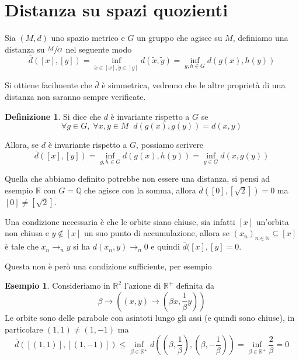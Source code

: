 \documentclass[a4paper,10pt]{article}
\newcounter{counter1}
\theoremstyle{plain}
\theoremstyle{definition}
\newtheorem{mydef}[counter1]{Definizione}
\newtheorem{myes}[counter1]{Esempio}
\theoremstyle{remark}
\newtheorem{mynot}[counter1]{Nota}
\newcommand{\pa}[1]{\left(#1\right)}
\newcommand{\bra}[1]{\left[#1\right]}
\begin{document}




\section{Distanza su spazi quozienti}

Sia $(M,d)$ uno spazio metrico e $G$ un gruppo che agisce su $M$,
definiamo una distanza su $\sfrac{M}{G}$ nel seguente modo
\[ \bar d (\bra{x}, \bra{y}) = \inf _{\tilde x \in \bra{x} , \tilde y
  \in \bra {y}} d(\tilde x , \tilde y) = \inf _ {g,h \in G} d(g(x),
h(y)) \]

Si ottiene facilmente che $\bar d$ è simmetrica, vedremo che le altre
proprietà di una distanza non saranno sempre verificate.

\begin{mydef}
  Si dice che $d$ è invariante rispetto a $G$ se
\[ \forall g \in G,\; \forall x,y \in M \;\; d(g(x),g(y)) = d(x,y) \]
\end{mydef}

Allora, se $d$ è invariante rispetto a $G$, possiamo scrivere
\[ \bar d (\bra{x}, \bra{y}) = \inf _ {g,h \in G} d(g(x), h(y)) =
\inf _{g \in G} d(x,g(y)) \]

Quella che abbiamo definito potrebbe non essere una distanza, si pensi
ad esempio $\mathbb{R}$ con $G = \mathbb{Q}$ che agisce con la somma,
allora $\bar d \pa{ \bra{0} , \bra{\sqrt{2}} } = 0$ ma $\bra{0} \neq
\bra{\sqrt{2}}$.

Una condizione necessaria è che le orbite siano chiuse, sia infatti
$\bra{x}$ un'orbita non chiusa e $y \not\in \bra{x}$ un suo punto di
accumulazione, allora se $\pa{ x_n} _{n \in \mathbb{N}} \subseteq
\bra{x}$ è tale che $x_n \to _n y$ si ha $d(x_n,y) \to _n 0$ e quindi
$\bar d(\bra{x},\bra{y} = 0$.

Questa non è però una condizione sufficiente, per esempio
\begin{myes}
  Consideriamo in $\mathbb{R}^2$ l'azione di $\mathbb{R}^+$ definita
  da
  \[ \beta \to \pa{ \pa{x,y} \to \pa{\beta x , \frac{1}{\beta}y } } \]
  Le orbite sono delle parabole con asintoti lungo gli assi (e quindi
  sono chiuse), in particolare $\pa{1,1} \neq \pa{1,-1}$ ma
  \[ \bar d( \bra{ \pa{ 1,1} } , \bra{ \pa {1, -1}} ) \le \inf _{\beta
    \in \mathbb{R}^+ } d\pa{ \pa{ \beta , \frac{1}{\beta} } , \pa{
      \beta , - \frac{1}{\beta}} } = \inf _{ \beta \in \mathbb{R}^+ }
  \frac{2}{\beta} = 0 \]
\end{myes}
\end{document}

